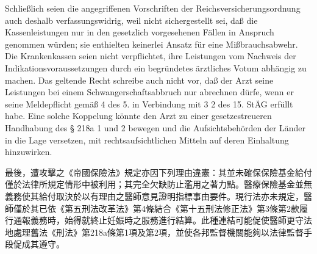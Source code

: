\documentclass[12pt]{article}
\begin{document}
\begin{sourcepara}[title={原文理由 B.I.2.b} Rn 100]
Schließlich seien die angegriffenen Vorschriften der Reichsversicherungsordnung auch deshalb verfassungswidrig, weil nicht sichergestellt sei, daß die Kassenleistungen nur in den gesetzlich vorgesehenen Fällen in Anspruch genommen würden; sie enthielten keinerlei Ansatz für eine Mißbrauchsabwehr. Die Krankenkassen seien nicht verpflichtet, ihre Leistungen vom Nachweis der Indikationsvoraussetzungen durch ein begründetes ärztliches Votum abhängig zu machen. Das geltende Recht schreibe auch nicht vor, daß der Arzt seine Leistungen bei einem Schwangerschaftsabbruch nur abrechnen dürfe, wenn er seine Meldepflicht gemäß \abbrArt{} 4 des 5. \abbrStrRG{} in Verbindung mit \abbrArt{} 3 \abbrNr{} 2 des 15. StÄG erfüllt habe. Eine solche Koppelung könnte den Arzt zu einer gesetzestreueren Handhabung des § 218a \abbrAbs{} 1 und 2 \abbrStGB{} \abbrAF{} bewegen und die Aufsichtsbehörden der Länder in die Lage versetzen, mit rechtsaufsichtlichen Mitteln auf deren Einhaltung hinzuwirken.
\end{sourcepara}
\begin{transpara}
最後，遭攻擊之《帝國保險法》規定亦因下列理由違憲：其並未確保保險基金給付僅於法律所規定情形中被利用；其完全欠缺防止濫用之著力點。醫療保險基金並無義務使其給付取決於以有理由之醫師意見證明指標事由要件。現行法亦未規定，醫師僅於其已依《第五刑法改革法》第4條結合《第十五刑法修正法》第3條第2款履行通報義務時，始得就終止妊娠時之服務進行結算。此種連結可能促使醫師更守法地處理舊法《刑法》第218a條第1項及第2項，並使各邦監督機關能夠以法律監督手段促成其遵守。
\end{transpara}

\end{document}
